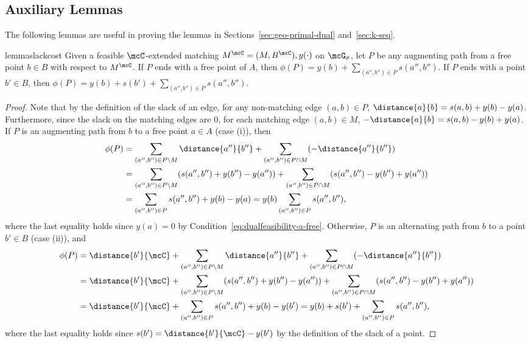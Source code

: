 %
%
%
%
%
%
%
%
%
%
%
%
%
%


%
%
%
    
%
%

\subsection{Auxiliary Lemmas}
The following lemmas are useful in proving the lemmas in Sections~\ref{sec:geo-primal-dual} and~\ref{sec:k-seq}.


\begin{restatable}{lemma}{slackcost}
\label{lem:slackcost}
Given a feasible $\mcC$-extended matching $M^{\mcC} = (M, B^{\mcC}),y(\cdot)$ on $\mcG_\sigma$, let $P$ be any augmenting path from a free point $b\in B$ with respect to $M^{\mcC}$. If $P$ ends with a free point of $A$, then $\phi(P) = y(b) +\sum_{(a'',b'') \in P}s(a'',b'')$. If $P$ ends with a point $b' \in B$, then $\phi(P)= y(b) + s(b') + \sum_{(a'',b'') \in P}s(a'',b'')$.  
\end{restatable}
\begin{proof}
    Note that by the definition of the slack of an edge, for any non-matching edge $(a,b)\in P$, $\distance{a}{b} = s(a,b) + y(b)-y(a)$. Furthermore, since the slack on the matching edges are $0$, for each matching edge $(a,b)\in M$, $-\distance{a}{b} = s(a,b) - y(b)+y(a)$. 
    If $P$ is an augmenting path from $b$ to a free point $a\in A$ (case (i)), then
    \begin{align*}
        \phi(P)&=\sum_{(a'',b'')\in P\setminus M} \distance{a''}{b''} + \sum_{(a'',b'')\in P\cap M} (-\distance{a''}{b''})\\&= \sum_{(a'',b'')\in P\setminus M} (s(a'',b'') + y(b'')-y(a'')) + \sum_{(a'',b'')\in P\cap M} (s(a'',b'') - y(b'')+y(a''))\\ &= \sum_{(a'',b'')\in P} s(a'',b'') + y(b) - y(a)=  y(b) \sum_{(a'',b'')\in P} s(a'',b''),
    \end{align*}
    where the last equality holds since $y(a)=0$ by Condition~\eqref{eq:dualfeasibility-a-free}. Otherwise, $P$ is an alternating path from $b$ to a point $b'\in B$ (case (ii)), and 
        \begin{align*}
            \phi(P)&=\distance{b'}{\mcC} + \sum_{(a'',b'')\in P\setminus M} \distance{a''}{b''} + \sum_{(a'',b'')\in P\cap M} (-\distance{a''}{b''})\\&= \distance{b'}{\mcC} + \sum_{(a'',b'')\in P\setminus M} (s(a'',b'') + y(b'')-y(a'')) + \sum_{(a'',b'')\in P\cap M} (s(a'',b'') - y(b'')+y(a''))\\ &= \distance{b'}{\mcC} + \sum_{(a'',b'')\in P} s(a'',b'') + y(b) - y(b')= y(b) + s(b') + \sum_{(a'',b'')\in P} s(a'',b''),
        \end{align*}
        where the last equality holds since $s(b') = \distance{b'}{\mcC} - y(b')$ by the definition of the slack of a point.
\end{proof}

